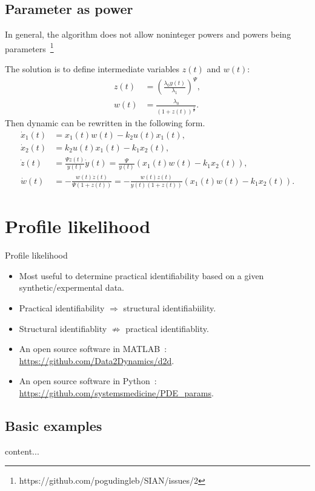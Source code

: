 \documentclass[10pt]{beamer}
\begin{document}
\subsection{Parameter as power}

\begin{frame}{In general, the algorithm does not allow noninteger powers and powers being parameters~\footnote{https://github.com/pogudingleb/SIAN/issues/2}}
	
	The solution is to define intermediate variables $z(t)$ and $w(t)$:
	\begin{subequations}
		\begin{align}
			z(t) &= (\frac{\lambda_0 y(t)}{\lambda_1})^\Psi, \\
			w(t) &= \frac{\lambda_0}{(1+z(t))^\frac{1}{\Psi}}.
		\end{align}
	\end{subequations}
	Then dynamic can be rewritten in the following form.
	\begin{subequations}
		\begin{align}
			\dot x_1(t) &= x_1(t) w(t) - k_2 u(t) x_1(t), \\
			\dot x_2(t) &= k_2 u(t) x_1(t) - k_1 x_2(t), \\
			\dot z(t) &=  \frac{\Psi z(t)}{y(t)} \dot y(t) = 
			\frac{\Psi}{y(t)} (x_1(t) w(t) - k_1 x_2(t)), \\
			\dot w(t) &= - \frac{w(t) \dot z(t)}{\Psi (1+z(t))} = 
			- \frac{w(t) z(t)}{y(t) (1+z(t))} (x_1(t) w(t) - k_1 x_2(t)).
		\end{align}
	\end{subequations}
\end{frame}

\section{Profile likelihood}

\begin{frame}{Profile likelihood}
	\begin{itemize}
		\item Most useful to determine practical identifiability based on a given synthetic/expermental data.
		\item Practical identifiability $\Rightarrow$ structural identifiabiility.
		\item Structural identifiablity $\nRightarrow$ practical identifiablity.
		\vspace{10pt}
		\item An open source software in MATLAB~: 
		\url{https://github.com/Data2Dynamics/d2d}.
		\item An open source software in Python~: \url{https://github.com/systemsmedicine/PDE_params}.
	\end{itemize}
\end{frame}

\subsection{Basic examples}

\begin{frame}
	content...
\end{frame}
\end{document}
